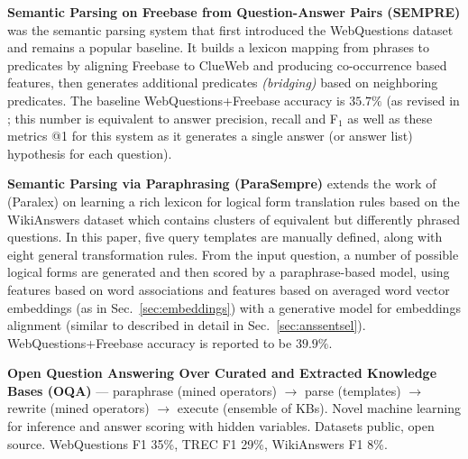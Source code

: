 \textbf{Semantic Parsing on Freebase from Question-Answer Pairs (SEMPRE)} \citep{Semantic2013Berant}
	was the semantic parsing system that first introduced the WebQuestions dataset
	and remains a popular baseline.
	It builds a lexicon mapping from phrases to predicates
	by aligning Freebase to ClueWeb and producing co-occurrence
	based features, then generates
	additional predicates \textit{(bridging)}
	based on neighboring predicates.
	The baseline WebQuestions+Freebase accuracy is $35.7\%$
	(as revised in \cite{FreebaseQA2014Yao};
	this number is equivalent to answer precision, recall and F$_1$
	as well as these metrics @1
	for this system as it generates a single answer (or answer list)
	hypothesis for each question).


\textbf{Semantic Parsing via Paraphrasing (ParaSempre)} \citep{SPBerant2014Paraphrase}
	extends the work of \cite{Fader2013Paraphrase} (Paralex)
	on learning a rich lexicon for logical form translation rules
	based on the WikiAnswers dataset which contains clusters of
	equivalent but differently phrased questions.
	In this paper,
	five query templates are manually defined, along with
	eight general transformation rules.
	From the input question, a number of possible logical forms
	are generated and then scored by a paraphrase-based model,
	using features based on word associations and features
	based on averaged word vector embeddings (as in Sec.~\ref{sec:embeddings})
	with a generative model for embeddings alignment (similar
	to \citep{Yu2014Deep} described in detail in Sec.~\ref{sec:anssentsel}).
	WebQuestions+Freebase accuracy is reported to be $39.9\%$.

\textbf{Open Question Answering Over Curated and Extracted Knowledge Bases (OQA)} \citep{OQA}
	--- paraphrase (mined operators) $\to$ parse (templates) $\to$ rewrite (mined operators) $\to$ execute (ensemble of KBs).
	Novel machine learning for inference and answer scoring with hidden variables.
	Datasets public, open source.
	WebQuestions F1 35\%, TREC F1 29\%, WikiAnswers F1 8\%.

